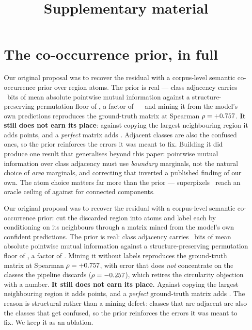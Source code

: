 \documentclass[10pt,a4paper]{article}                        %
\title{Supplementary material}
\date{}
\newcommand{\best}[1]{\textbf{#1}}
\begin{document}
\maketitle

\section{The co-occurrence prior, in full}
\label{sup:prior}

Our original proposal was to recover the residual with a corpus-level semantic
co-occurrence prior over region atoms. The prior is real --- class adjacency
carries \pmiSignal{}~bits of mean absolute pointwise mutual information against a
structure-preserving permutation floor of \pmiFloor{}, a factor of \pmiRatio{} ---
and mining it from the model's own predictions reproduces the ground-truth matrix
at Spearman $\rho=+0.757{}$. \best{It still does not earn its place}: against
copying the largest neighbouring region it adds \priorGain{} points, and a
\emph{perfect} matrix adds \priorOracle{}. Adjacent classes are also the confused
ones, so the prior reinforces the errors it was meant to fix. Building it did
produce one result that generalises beyond this paper: pointwise mutual information
over class adjacency must use \emph{boundary} marginals, not the natural choice of
\emph{area} marginals, and correcting that inverted a published finding of our own.
The atom choice matters far more than the prior --- superpixels~\cite{slic} reach
an oracle ceiling of \ceilSLIC{} against \ceilCC{} for connected components.

Our original proposal was to recover the residual with a corpus-level semantic
co-occurrence prior: cut the discarded region into atoms and label each by
conditioning on its neighbours through a matrix mined from the model's own
confident predictions. The prior is real: class adjacency carries \pmiSignal{}~bits of mean absolute
pointwise mutual information against a structure-preserving permutation floor of
\pmiFloor{}, a factor of \pmiRatio{}. Mining it without labels reproduces the
ground-truth matrix at Spearman $\rho=+0.757{}$, with error that does
\emph{not} concentrate on the classes the pipeline discards ($\rho=-0.257{}$),
which retires the circularity objection with a number.
\best{It still does not earn its place.} Against copying the largest neighbouring
region it adds \priorGain{} points, and a \emph{perfect} ground-truth matrix adds
\priorOracle{}. The reason is structural rather than a mining defect: classes
that are adjacent are also the classes that get confused, so the prior reinforces
the errors it was meant to fix. We keep it as an ablation.
\end{document}

